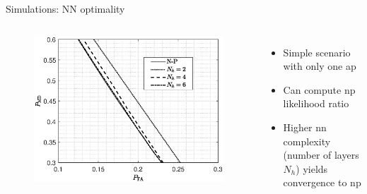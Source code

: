\documentclass[10pt]{beamer}
\begin{document}
\begin{frame}{Simulations: NN optimality}
\begin{columns}
	\begin{figure}[]
		\centering
	\includegraphics[width=1\columnwidth]{FA_MD_LOS.eps}
	\end{figure}
	\begin{itemize}
		\item Simple scenario with only one \ac{ap}
		\item Can compute \ac{np} likelihood ratio
		\item Higher \ac{nn} complexity (number of layers $N_h$) yields convergence to \ac{np}
	\end{itemize}
\end{columns}
\end{frame}
\end{document}
